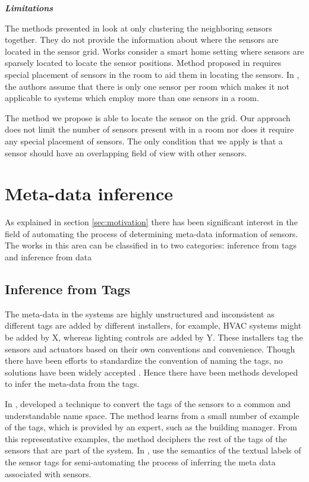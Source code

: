 \textbf{\textit{Limitations}}\par
The methods presented in \cite{Hong:2013:TAS:2528282.2528302,doi:10.1061/9780784413616.226,Koc:2014:CLC:2674061.2674075,muller2014automated} look at only clustering the neighboring sensors together. They do not provide the information about where the sensors are located in the sensor grid. Works \cite{ellis2012creating,Lu:2014:SBS:2648771.2629441,muller2014automated} consider a smart home setting where sensors are sparsely located to locate the sensor positions. Method proposed in \cite{Lu:2014:SBS:2648771.2629441} requires special placement of sensors in the room to aid them in locating the sensors. In \cite{ellis2012creating}, the authors assume that there is only one sensor per room which makes it not applicable to systems which employ more than one sensors in a room. 

The method we propose is able to locate the sensor on the grid. Our approach does not limit the number of sensors present with in a room nor does it require any special placement of sensors. The only condition that we apply is that a sensor should have an overlapping field of view with other sensors.


\section{Meta-data inference}

As explained in section \ref{sec:motivation} there has been significant interest in the field of automating the process of determining meta-data information of sensors. The works in this area can be classified in to two categories: inference from tags and inference from data
\subsection{Inference from Tags}
The meta-data in the systems are highly unstructured and inconsistent as different tags are added by different installers, for example, HVAC systems might be added by X, whereas lighting controls are added by Y. These installers tag the sensors and actuators based on their own conventions and convenience. Though there have been efforts to standardize the convention of naming the tags, no solutions have been widely accepted \cite{gao2015data}. Hence there have been methods developed to infer the meta-data from the tags.

In \cite{bhattacharya2014enabling}, \citeauthor{bhattacharya2014enabling} developed a technique to convert the tags of the sensors to a common and understandable name space. The method learns from a small number of example of the tags, which is provided by an expert, such as the building manager. From this representative examples, the method deciphers the rest of the tags of the sensors that are part of the system.
In \cite{Schumann:2014:TAD:2674061.2674081}, \citeauthor{Schumann:2014:TAD:2674061.2674081} use the semantics of the textual labels of the sensor tags for semi-automating the process of inferring the meta data associated with sensors.
